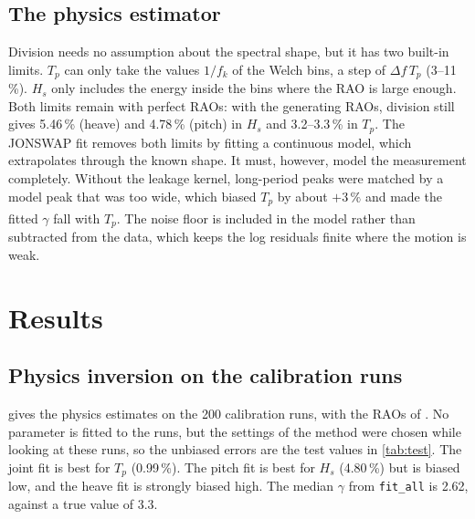 \documentclass[11pt,a4paper]{article}
\newcommand{\Hs}{H_{s}}
\newcommand{\Tp}{T_{p}}
\newcommand{\pct}[1]{#1\,\%}
\newcommand{\dagnote}{\textsuperscript{\dag}}
\begin{document}
\subsection{The physics estimator}
\label{sec:dec_fit}

Division needs no assumption about the spectral shape, but it has two built-in limits. $\Tp$ can
only take the values $1/f_k$ of the Welch bins, a step of $\Delta f\,\Tp$ (3--11\,\%). $\Hs$ only
includes the energy inside the bins where the RAO is large enough. Both limits remain with
perfect RAOs: with the generating RAOs, division still gives \pct{5.46} (heave) and \pct{4.78}
(pitch) in $\Hs$ and 3.2--3.3\,\% in $\Tp$. The JONSWAP fit removes both limits by fitting a
continuous model, which extrapolates through the known shape. It must, however, model the
measurement completely. Without the leakage kernel, long-period peaks were matched by a model
peak that was too wide, which biased $\Tp$ by about $+\pct{3}$ and made the fitted $\gamma$
fall with $\Tp$\dagnote. The noise floor is included in the model rather than subtracted from
the data, which keeps the log residuals finite where the motion is weak.

\section{Results}
\label{sec:results}

\subsection{Physics inversion on the calibration runs}

 gives the physics estimates on the 200 calibration runs, with the RAOs of
. No parameter is fitted to the runs, but the settings of the
method were chosen while looking at these runs, so the unbiased errors are the test values in
\cref{tab:test}. The joint fit is best for $\Tp$ (\pct{0.99}). The pitch fit is best for
$\Hs$ (\pct{4.80}) but is biased low, and the heave fit is strongly biased high. The median
$\gamma$ from \texttt{fit\_all} is 2.62, against a true value of 3.3.
\end{document}
